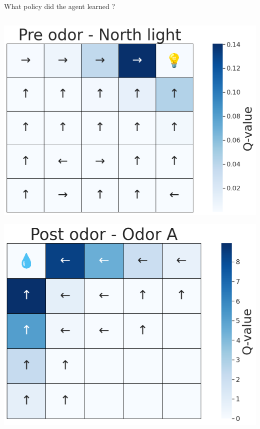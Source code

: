 \documentclass[bigger]{beamer}
\begin{document}
\begin{frame}[label={sec:orgc1fc0cc}]{What policy did the agent learned ?}
\addtocounter{framenumber}{-1}
\begin{columns}
\begin{column}[t]{0.5\columnwidth}
\begin{center}
\includegraphics[height=0.4\textheight]{img/policy-allo-north-light.png}
\end{center}
\begin{center}
\includegraphics[height=0.4\textheight]{img/policy-allo-odor-A.png}
\end{center}
\end{column}

\end{columns}
\end{frame}
\end{document}

